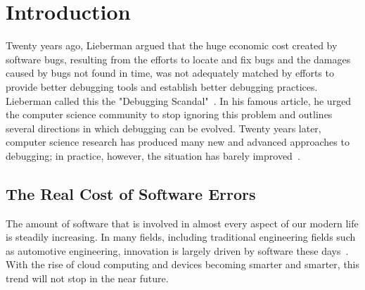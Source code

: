 \chapter{Introduction}
\label{sec:introduction}

Twenty years ago, Lieberman 
argued that the huge economic cost created by software bugs, resulting from the efforts to locate and fix bugs and the damages caused by bugs  not found in time, was not adequately matched by efforts to provide better debugging tools and establish better debugging practices.
Lieberman called this the "Debugging Scandal"~\cite{lieberman97:the_debugging_scandal}.
In his famous article, he urged the computer science community to stop ignoring this problem and outlines several directions in which debugging can be evolved.
Twenty years later, computer science research has produced many new and advanced approaches to debugging; in practice, however, the situation has barely improved~\cite{yin11:debugging_scandal_the_next, perscheid17:studying_the_advancement}.

\section{The Real Cost of Software Errors}

The amount of software that is involved in almost every aspect of our modern life is steadily increasing.
In many fields, including traditional engineering fields such as automotive engineering, innovation is largely driven by software these days~\cite{evans08:invisible_engines_how_software, gorschek10:a_lightweight_innovation_process}.
With the rise of cloud computing and devices becoming smarter and smarter, this trend will not stop in the near future.


